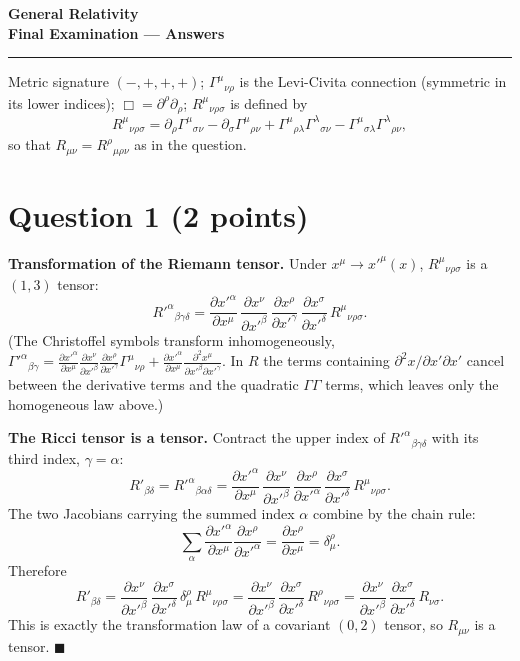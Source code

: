 \documentclass[12pt]{article}
\begin{document}
\begin{center}
{\bf\Large General Relativity}\\[0.3em]
{\bf\large Final Examination --- Answers}
\end{center}

\hrule
\vspace{0.5em}
 Metric signature $(-,+,+,+)$; $\Gamma^\mu{}_{\nu\rho}$ is the Levi-Civita connection (symmetric in its lower indices); $\Box = \partial^\rho\partial_\rho$; $R^\mu{}_{\nu\rho\sigma}$ is defined by
\[
R^\mu{}_{\nu\rho\sigma}=\partial_\rho\Gamma^\mu{}_{\sigma\nu}-\partial_\sigma\Gamma^\mu{}_{\rho\nu}+\Gamma^\mu{}_{\rho\lambda}\Gamma^\lambda{}_{\sigma\nu}-\Gamma^\mu{}_{\sigma\lambda}\Gamma^\lambda{}_{\rho\nu},
\]
so that $R_{\mu\nu}=R^\rho{}_{\mu\rho\nu}$ as in the question.

\section*{Question 1 (2 points)}

\textbf{Transformation of the Riemann tensor.} Under $x^\mu \to x'^\mu(x)$, $R^\mu{}_{\nu\rho\sigma}$ is a $(1,3)$ tensor:
\[
R'^{\alpha}{}_{\beta\gamma\delta}=\frac{\partial x'^\alpha}{\partial x^\mu}\,\frac{\partial x^\nu}{\partial x'^\beta}\,\frac{\partial x^\rho}{\partial x'^\gamma}\,\frac{\partial x^\sigma}{\partial x'^\delta}\,R^\mu{}_{\nu\rho\sigma}.
\]
(The Christoffel symbols transform inhomogeneously, $\Gamma'^\alpha{}_{\beta\gamma}=\frac{\partial x'^\alpha}{\partial x^\mu}\frac{\partial x^\nu}{\partial x'^\beta}\frac{\partial x^\rho}{\partial x'^\gamma}\Gamma^\mu{}_{\nu\rho}+\frac{\partial x'^\alpha}{\partial x^\mu}\frac{\partial^2 x^\mu}{\partial x'^\beta\partial x'^\gamma}$. In $R$ the terms containing $\partial^2x/\partial x'\partial x'$ cancel between the derivative terms and the quadratic $\Gamma\Gamma$ terms, which leaves only the homogeneous law above.)

\textbf{The Ricci tensor is a tensor.} Contract the upper index of $R'^\alpha{}_{\beta\gamma\delta}$ with its third index, $\gamma=\alpha$:
\[
R'_{\beta\delta}=R'^{\alpha}{}_{\beta\alpha\delta}
=\frac{\partial x'^\alpha}{\partial x^\mu}\,\frac{\partial x^\nu}{\partial x'^\beta}\,\frac{\partial x^\rho}{\partial x'^\alpha}\,\frac{\partial x^\sigma}{\partial x'^\delta}\,R^\mu{}_{\nu\rho\sigma}.
\]
The two Jacobians carrying the summed index $\alpha$ combine by the chain rule:
\[
\sum_\alpha \frac{\partial x'^\alpha}{\partial x^\mu}\frac{\partial x^\rho}{\partial x'^\alpha}=\frac{\partial x^\rho}{\partial x^\mu}=\delta^\rho_\mu .
\]
Therefore
\[
R'_{\beta\delta}=\frac{\partial x^\nu}{\partial x'^\beta}\,\frac{\partial x^\sigma}{\partial x'^\delta}\,\delta^\rho_\mu\,R^\mu{}_{\nu\rho\sigma}
=\frac{\partial x^\nu}{\partial x'^\beta}\,\frac{\partial x^\sigma}{\partial x'^\delta}\,R^\rho{}_{\nu\rho\sigma}
=\frac{\partial x^\nu}{\partial x'^\beta}\,\frac{\partial x^\sigma}{\partial x'^\delta}\,R_{\nu\sigma}.
\]
This is exactly the transformation law of a covariant $(0,2)$ tensor, so $R_{\mu\nu}$ is a tensor. $\blacksquare$
\end{document}
